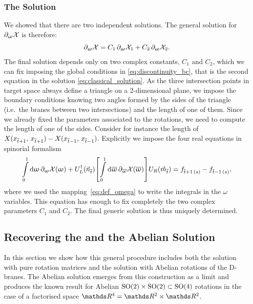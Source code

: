 \subsubsection{The Solution}
  
We showed that there are two independent solutions.
The general solution for $\partial_{\upomega} \mathcal{X}$ is therefore:
\begin{equation}
  \partial_{\upomega} \mathcal{X}
  =
  C_1\, \partial_{\upomega} \mathcal{X}_1 + C_2\, \partial_{\upomega} \mathcal{X}_2.
  \label{eq:general_solution}
\end{equation}
The final solution depends only on two complex constants, $C_1$ and $C_2$, which we can fix imposing the global conditions in \eqref{eq:discontinuity_bc}, that is the second equation in the solution \eqref{eq:classical_solution}.
As the three intersection points in target space always define a triangle on a 2-dimensional plane, we impose the boundary conditions knowing two angles formed by the sides of the triangle (i.e.\ the branes between two intersections) and the length of one of them.
Since we already fixed the parameters associated to the rotations, we need to compute the length of one of the sides.
Consider for instance the length of $X(x_{\overline{t}+1},\, x_{\overline{t}+1}) - X(x_{\overline{t}-1},\, x_{\overline{t}-1})$.
Explicitly we impose the four real equations in spinorial formalism
\begin{equation}
  \int\limits_{0}^{1} \dd{\ensuremath{\upomega}}
  \partial_{\upomega} \mathcal{X}(\upomega)
  +
  U_L^{\dagger}(\vec{n}_{{\overline{t}}})
  \qty[
    \int\limits_{0}^{1} \dd{\ensuremath{\overline{\upomega}}} \partial_{\overline{\upomega}} \mathcal{X}(\overline{\upomega})
  ]
  U_R(\vec{m}_{{\overline{t}}})
  =
  f_{{\overline{t}+1}\, (s)} - f_{{\overline{t}-1}\, (s)},
\end{equation}
where we used the mapping~\eqref{eq:def_omega} to write the integrals in the $\omega$ variables.
This equation has enough \dof to fix completely the two complex parameters $C_1$ and $C_2$.
The final generic solution is thus uniquely determined.


\subsection{Recovering the \texorpdfstring{}{SU(2)} and the Abelian Solution}

In this section we show how this general procedure includes both the solution with pure  rotation matrices and the solution with Abelian rotations of the D-branes.
The Abelian solution emerges from this construction as a limit and produces the known result for Abelian $\mathrm{SO}(2) \times \mathrm{SO}(2) \subset \mathrm{SO}(4)$ rotations in the case of a factorised space $\R^4 = \R^2 \times \R^2$.

